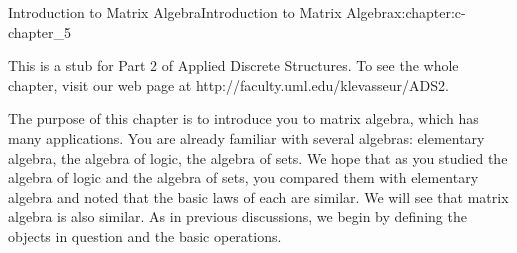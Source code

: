 \documentclass[twoside,10pt,]{book}
\numberwithin{equation}{section}
\begin{document}
\begin{chapterptx}{Introduction to Matrix Algebra}{}{Introduction to Matrix Algebra}{}{}{x:chapter:c-chapter_5}
\begin{introduction}{}%
This is a stub for Part 2 of Applied Discrete Structures. To see the whole chapter, visit our web page at http:\slash{}\slash{}faculty.uml.edu\slash{}klevasseur\slash{}ADS2.%
\par
The purpose of this chapter is to introduce you to matrix algebra, which has many applications. You are already familiar with several algebras: elementary algebra, the algebra of logic, the algebra of sets. We hope that as you studied the algebra of logic and the algebra of sets, you compared them with elementary algebra and noted that the basic laws of each are similar. We will see that matrix algebra is also similar. As in previous discussions, we begin by defining the objects in question and the basic operations.%
\end{introduction}%
\end{chapterptx}
%
%
\typeout{************************************************}
\typeout{************************************************}
%
\end{document}

